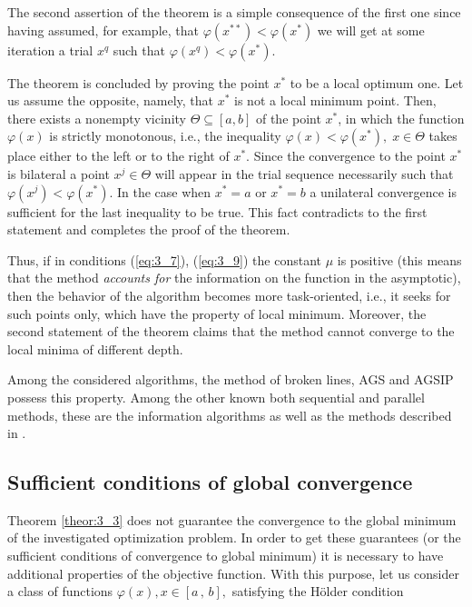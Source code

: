 	The second assertion of the theorem is a simple consequence of the first one since having assumed, for example, that $\varphi (x^{**} )<\varphi (x^{*} )$ we will get at some iteration a trial $x^{q} $ such that $\varphi (x^q )<\varphi (x^{*} )$. 
	
	The theorem is concluded by proving the point $x^{*} $ to be a local optimum one. Let us assume the opposite, namely, that $x^{*} $ is not a local minimum point. Then, there exists a nonempty vicinity $\Theta \subseteq [a,b]$ of the point $x^{*} $, in which the function $\varphi (x)$ is strictly monotonous, i.e., the inequality $\varphi (x)<\varphi (x^{*} ),\; x\in \Theta $ takes place either to the left or to the right of $x^{*} $. Since the convergence to the point $x^{*} $ is bilateral a point $x^j \in \Theta $ will appear in the trial sequence necessarily such that $\varphi (x^j)<\varphi (x^{*} )$. In the case when $x^{*} =a$ or $x^{*} =b$ a unilateral convergence is sufficient for the last inequality to be true. This fact contradicts to the first statement and completes the proof of the theorem.
	
	Thus, if in conditions  (\ref{eq:3_7}),  (\ref{eq:3_9}) the constant $\mu$ is positive (this means that the method \textit{accounts for} the information on the function in the asymptotic), then the behavior of the algorithm becomes more task-oriented, i.e., it seeks for such points only, which have the property of local minimum. Moreover, the second statement of the theorem claims that the method cannot converge to the local minima of different depth.
	
	Among the considered algorithms, the method of broken lines, AGS and AGSIP possess this property. Among the other known both sequential and parallel methods, these are the information algorithms \cite{3_GrishaginStrongin_EnginCybernetics, 3_SergeyevLocTun, 3_SergMukhKvasLera, 3_StrMonRus, 3_StrMarkin, 3_StrSergMon2000} as well as the methods described in \cite{3_Pinter, 3_SergGri1994, 3_SergeyevGrishaginOMS}.
	
		
	\subsection{Sufficient conditions of global convergence}
	
	Theorem \ref{theor:3_3} does not guarantee the convergence to the global minimum of the investigated optimization problem. In order to get these guarantees (or the sufficient conditions of convergence to global minimum) it is necessary to have additional properties of the objective function. With this purpose, let us consider a class of functions $\varphi (x),x\in [a\, ,\, b],$ satisfying the H\"{o}lder condition 
	
